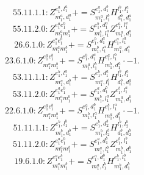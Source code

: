 \documentclass[letterpaper,10pt,fleqn,leqno,onecolumn]{article}
\begin{document}
\begin{equation} \;\;\;\;\;\;  55.11.1.1: Z^{e_{1}^{a},l_{1}^{a}}_{m_{1}^{a},d_{1}^{a}}+=S^{e_{1}^{a},d_{1}^{b}}_{m_{1}^{a},l_{1}^{b}}H^{l_{1}^{b},l_{1}^{a}}_{d_{1}^{b},d_{1}^{a}} \end{equation}
\begin{equation} \;\;\;\;\;\;  55.11.2.0: Z^{e_{1}^{a}e_{1}^{b}}_{m_{1}^{a}m_{1}^{b}}+=S^{e_{1}^{b},d_{1}^{a}}_{m_{1}^{b},l_{1}^{a}}Z^{e_{1}^{a},l_{1}^{a}}_{m_{1}^{a},d_{1}^{a}} \end{equation}
\begin{equation} \;\;\;\;\;\;  26.6.1.0: Z^{e_{1}^{a}e_{1}^{b}}_{m_{1}^{a}m_{1}^{b}}+=S^{e_{1}^{b},d_{1}^{a}}_{m_{1}^{b},l_{1}^{a}}H^{e_{1}^{a},l_{1}^{a}}_{m_{1}^{a},d_{1}^{a}} \end{equation}
\begin{equation} \;\;\;\;\;\;  23.6.1.0: Z^{e_{1}^{a}e_{1}^{b}}_{m_{1}^{a}m_{1}^{b}}+=S^{e_{1}^{b},d_{1}^{a}}_{m_{1}^{a},l_{1}^{b}}H^{e_{1}^{a},l_{1}^{b}}_{m_{1}^{b},d_{1}^{a}}\cdot -1. \end{equation}
\begin{equation} \;\;\;\;\;\;  53.11.1.1: Z^{e_{1}^{b},l_{1}^{a}}_{m_{1}^{a},d_{1}^{b}}+=S^{e_{1}^{b},d_{1}^{a}}_{m_{1}^{a},l_{1}^{b}}H^{l_{1}^{b},l_{1}^{a}}_{d_{1}^{b},d_{1}^{a}} \end{equation}
\begin{equation} \;\;\;\;\;\;  53.11.2.0: Z^{e_{1}^{a}e_{1}^{b}}_{m_{1}^{a}m_{1}^{b}}+=S^{e_{1}^{a},d_{1}^{b}}_{m_{1}^{b},l_{1}^{a}}Z^{e_{1}^{b},l_{1}^{a}}_{m_{1}^{a},d_{1}^{b}} \end{equation}
\begin{equation} \;\;\;\;\;\;  22.6.1.0: Z^{e_{1}^{a}e_{1}^{b}}_{m_{1}^{a}m_{1}^{b}}+=S^{e_{1}^{a},d_{1}^{b}}_{m_{1}^{b},l_{1}^{a}}H^{e_{1}^{b},l_{1}^{a}}_{m_{1}^{a},d_{1}^{b}}\cdot -1. \end{equation}
\begin{equation} \;\;\;\;\;\;  51.11.1.1: Z^{e_{1}^{b},l_{1}^{b}}_{m_{1}^{b},d_{1}^{b}}+=S^{e_{1}^{b},d_{2}^{b}}_{m_{1}^{b},l_{2}^{b}}H^{l_{1}^{b},l_{2}^{b}}_{d_{1}^{b},d_{2}^{b}} \end{equation}
\begin{equation} \;\;\;\;\;\;  51.11.2.0: Z^{e_{1}^{a}e_{1}^{b}}_{m_{1}^{a}m_{1}^{b}}+=S^{e_{1}^{a},d_{1}^{b}}_{m_{1}^{a},l_{1}^{b}}Z^{e_{1}^{b},l_{1}^{b}}_{m_{1}^{b},d_{1}^{b}} \end{equation}
\begin{equation} \;\;\;\;\;\;  19.6.1.0: Z^{e_{1}^{a}e_{1}^{b}}_{m_{1}^{a}m_{1}^{b}}+=S^{e_{1}^{a},d_{1}^{b}}_{m_{1}^{a},l_{1}^{b}}H^{e_{1}^{b},l_{1}^{b}}_{m_{1}^{b},d_{1}^{b}} \end{equation}
\end{document}
